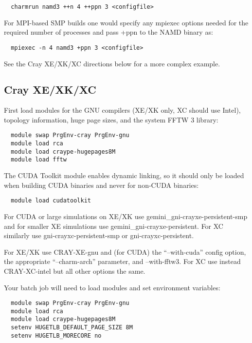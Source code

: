 \begin{verbatim}
  charmrun namd3 ++n 4 ++ppn 3 <configfile>
\end{verbatim}

For MPI-based SMP builds one would specify any mpiexec options needed
for the required number of processes and pass +ppn to the NAMD binary as:

\begin{verbatim}
  mpiexec -n 4 namd3 +ppn 3 <configfile>
\end{verbatim}

See the Cray XE/XK/XC directions below for a more complex example.

\subsection{Cray XE/XK/XC}

First load modules for the GNU compilers (XE/XK only, XC should use Intel),
topology information, huge page sizes, and the system FFTW 3 library:

\begin{verbatim}
  module swap PrgEnv-cray PrgEnv-gnu
  module load rca
  module load craype-hugepages8M
  module load fftw
\end{verbatim}

The CUDA Toolkit module enables dynamic linking, so it should only
be loaded when building CUDA binaries and never for non-CUDA binaries:

\begin{verbatim}
  module load cudatoolkit
\end{verbatim}

For CUDA or large simulations on XE/XK use gemini\_gni-crayxe-persistent-smp
and for smaller XE simulations use gemini\_gni-crayxe-persistent.  For XC
similarly use gni-crayxc-persistent-smp or gni-crayxc-persistent.

For XE/XK use CRAY-XE-gnu and (for CUDA) the ``--with-cuda'' config option,
the appropriate ``--charm-arch'' parameter, and --with-fftw3.  For XC
use instead CRAY-XC-intel but all other options the same.

Your batch job will need to load modules and set environment variables:

\begin{verbatim}
  module swap PrgEnv-cray PrgEnv-gnu
  module load rca
  module load craype-hugepages8M
  setenv HUGETLB_DEFAULT_PAGE_SIZE 8M
  setenv HUGETLB_MORECORE no
\end{verbatim}

